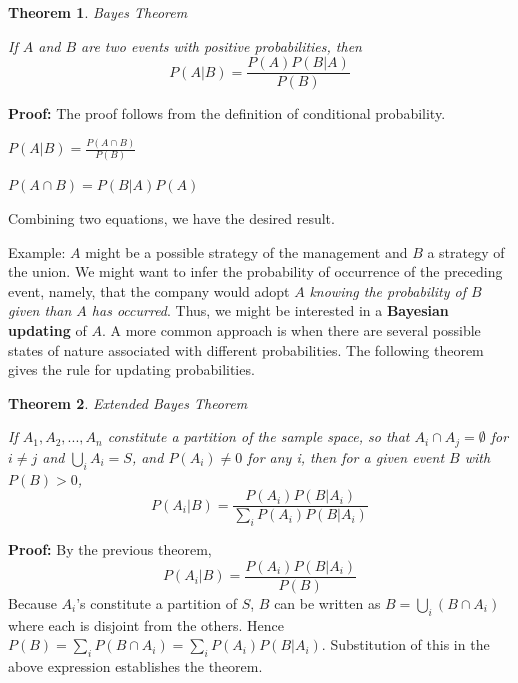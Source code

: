 \documentclass{article}
\newtheorem{theorem}{Theorem}[section]
\begin{document}
\begin{theorem}{Bayes Theorem}

    If \(A\) and \(B\) are two events with positive probabilities, then
    \begin{equation*}
        P(A|B)= \frac{P(A) P(B|A)}{P(B)}
    \end{equation*}
\end{theorem}
\textbf{Proof:} The proof follows from the definition of conditional probability.

\(P(A|B)= \frac{P(A \cap B)}{P(B)}\)

\(P(A \cap B) = P(B|A) P(A)\)

Combining two equations, we have the desired result.

Example: \(A\) might be a possible strategy of the management and \(B\) a strategy of the union. We might want to infer the probability of occurrence of the preceding event, namely, that the company would adopt \(A\) \textit{knowing the probability of \(B\) given than \(A\) has occurred}. Thus, we might be interested in a \textbf{Bayesian updating} of \(A\). A more common approach is when there are several possible states of nature associated with different probabilities. The following theorem gives the rule for updating probabilities.

\begin{theorem}{Extended Bayes Theorem}

    If \(A_1, A_2, ..., A_n\) constitute a partition of the sample space, so that \(A_i \cap A_j = \emptyset\) for \(i \neq j\) and \(\bigcup_{i} A_i = S\), and \(P(A_i) \neq 0\) for any i, then for a given event \(B\) with \(P(B) > 0\),
    \begin{equation*}
        P(A_i|B)=\frac{P(A_i) P(B|A_i)}{\sum_{i} P(A_i) P(B|A_i)}
    \end{equation*}
\end{theorem}
\textbf{Proof:} By the previous theorem, 
\begin{equation*}
     P(A_i|B)= \frac{P(A_i) P(B|A_i)}{P(B)}
\end{equation*}
Because \(A_i\)'s constitute a partition of \(S\), \(B\) can be written as \(B= \bigcup_{i}(B \cap A_i)\) where each is disjoint from the others. Hence \(P(B) = \sum_{i} P(B \cap A_i) = \sum_{i} P(A_i) P(B|A_i)\). Substitution of this in the above expression establishes the theorem.
\end{document}
